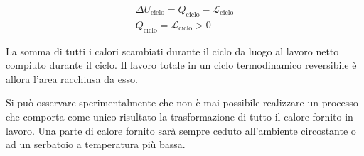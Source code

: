\begin{gather*}
	\Delta U_{\text{ciclo} } = Q_{\text{ciclo} } - \mathcal{L}_{\text{ciclo} } \\
	Q_{\text{ciclo} } = \mathcal{L}_{\text{ciclo} } > 0
\end{gather*}

La somma di tutti i calori scambiati durante il ciclo da luogo al lavoro netto compiuto durante il ciclo. Il lavoro totale in un ciclo termodinamico reversibile è allora l'area racchiusa da esso.

Si può osservare sperimentalmente che non è mai possibile realizzare un processo che comporta come unico risultato la trasformazione di tutto il calore fornito in lavoro. Una parte di calore fornito sarà sempre ceduto all'ambiente circostante o ad un serbatoio a temperatura più bassa.


